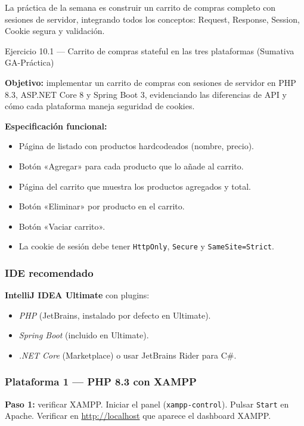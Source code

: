 \documentclass[11pt,a4paper,openany]{book}
\begin{document}
La práctica de la semana es construir un carrito de compras
completo con sesiones de servidor, integrando todos los conceptos:
Request, Response, Session, Cookie segura y validación.


\begin{cajaejercicio}{Ejercicio 10.1 --- Carrito de compras stateful en las tres plataformas (Sumativa GA-Práctica)}

\textbf{Objetivo:} implementar un carrito de compras con sesiones de
servidor en PHP 8.3, ASP.NET Core 8 y Spring Boot 3, evidenciando las
diferencias de API y cómo cada plataforma maneja seguridad de cookies.

\textbf{Especificación funcional:}
\begin{itemize}
\item Página de listado con productos hardcodeados (nombre, precio).
\item Botón «Agregar» para cada producto que lo añade al carrito.
\item Página del carrito que muestra los productos agregados y total.
\item Botón «Eliminar» por producto en el carrito.
\item Botón «Vaciar carrito».
\item La cookie de sesión debe tener \texttt{HttpOnly},
\texttt{Secure} y \texttt{SameSite=Strict}.
\end{itemize}

\subsubsection*{IDE recomendado}
\textbf{IntelliJ IDEA Ultimate} con plugins:
\begin{itemize}
\item \emph{PHP} (JetBrains, instalado por defecto en Ultimate).
\item \emph{Spring Boot} (incluido en Ultimate).
\item \emph{.NET Core} (Marketplace) o usar JetBrains Rider para C\#.
\end{itemize}

\subsubsection*{Plataforma 1 --- PHP 8.3 con XAMPP}

\textbf{Paso 1:} verificar XAMPP. Iniciar el panel
(\texttt{xampp-control}). Pulsar \texttt{Start} en Apache. Verificar
en \url{http://localhost} que aparece el dashboard XAMPP.


\end{cajaejercicio}
\end{document}
